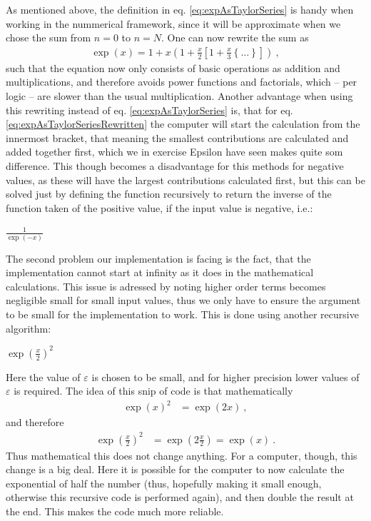 \documentclass[a4paper,12pt,amsmath,amssymb,aps]{article}
\begin{document}
As mentioned above, the definition in eq. \ref{eq:expAsTaylorSeries} is handy when working in the nummerical framework, since it will be approximate when we chose the sum from $n = 0$ to $n = N$. One can now rewrite the sum as
\begin{align} \label{eq:expAsTaylorSeriesRewritten}
	\exp(x) = 1 + x \left( 1 + \frac{x}{2} \left[ 1 + \frac{x}{3} \left\{ \dots \right\} \right] \right) \: ,
\end{align}
such that the equation now only consists of basic operations as addition and multiplications, and therefore avoids power functions and factorials, which -- per logic -- are slower than the usual multiplication. Another advantage when using this rewriting instead of eq. \ref{eq:expAsTaylorSeries} is, that for eq. \ref{eq:expAsTaylorSeriesRewritten} the computer will start the calculation from the innermost bracket, that meaning the smallest contributions are calculated and added together first, which we in exercise Epsilon have seen makes quite som difference. This though becomes a disadvantage for this methods for negative values, as these will have the largest contributions calculated first, but this can be solved just by defining the function recursively to return the inverse of the function taken of the positive value, if the input value is negative, i.e.:
\begin{algorithmic}
	\Return $\frac{1}{\exp(-x)}$
	\EndIf
\end{algorithmic}

The second problem our implementation is facing is the fact, that the implementation cannot start at infinity as it does in the mathematical calculations. This issue is adressed by noting higher order terms becomes negligible small for small input values, thus we only have to ensure the argument to be small for the implementation to work. This is done using another recursive algorithm:
\begin{algorithmic}
	\Return $\exp \left( \frac{x}{2} \right)^2$
	\EndIf
\end{algorithmic}
Here the value of $\varepsilon$ is chosen to be small, and for higher precision lower values of $\varepsilon$ is required. The idea of this snip of code is that mathematically
\begin{align}
	\exp(x)^2 &= \exp(2x) \: ,
\end{align}
and therefore
\begin{align}
	\exp\left( \frac{x}{2} \right)^2 &= \exp\left( 2\frac{x}{2} \right)
		= \exp(x) \: .
\end{align}
Thus mathematical this does not change anything. For a computer, though, this change is a big deal. Here it is possible for the computer to now calculate the exponential of half the number (thus, hopefully making it small enough, otherwise this recursive code is performed again), and then double the result at the end. This makes the code much more reliable.
\end{document}
